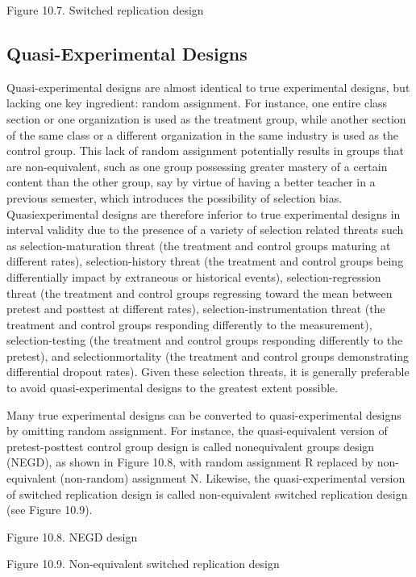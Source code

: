 Figure 10.7. Switched replication design

\subsection{Quasi-Experimental Designs}

Quasi-experimental designs are almost identical to true experimental designs, but lacking one key ingredient: random assignment. For instance, one entire class section or one organization is used as the treatment group, while another section of the same class or a different organization in the same industry is used as the control group. This lack of random assignment potentially results in groups that are non-equivalent, such as one group possessing greater mastery of a certain content than the other group, say by virtue of having a better teacher in a previous semester, which introduces the possibility of selection bias. Quasiexperimental designs are therefore inferior to true experimental designs in interval validity due to the presence of a variety of selection related threats such as selection-maturation threat (the treatment and control groups maturing at different rates), selection-history threat (the treatment and control groups being differentially impact by extraneous or historical events), selection-regression threat (the treatment and control groups regressing toward the mean between pretest and posttest at different rates), selection-instrumentation threat (the treatment and control groups responding differently to the measurement), selection-testing (the treatment and control groups responding differently to the pretest), and selectionmortality (the treatment and control groups demonstrating differential dropout rates). Given these selection threats, it is generally preferable to avoid quasi-experimental designs to the greatest extent possible.

Many true experimental designs can be converted to quasi-experimental designs by omitting random assignment. For instance, the quasi-equivalent version of pretest-posttest control group design is called nonequivalent groups design (NEGD), as shown in Figure 10.8, with random assignment R replaced by non-equivalent (non-random) assignment N. Likewise, the quasi-experimental version of switched replication design is called non-equivalent switched replication design (see Figure 10.9).

Figure 10.8. NEGD design

Figure 10.9. Non-equivalent switched replication design


